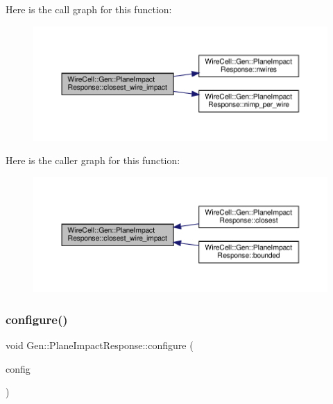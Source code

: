 Here is the call graph for this function\+:
\nopagebreak
\begin{figure}[H]
\begin{center}
\leavevmode
\includegraphics[width=350pt]{class_wire_cell_1_1_gen_1_1_plane_impact_response_a205df947b332100ddf1179b58b46f47e_cgraph}
\end{center}
\end{figure}
Here is the caller graph for this function\+:
\nopagebreak
\begin{figure}[H]
\begin{center}
\leavevmode
\includegraphics[width=350pt]{class_wire_cell_1_1_gen_1_1_plane_impact_response_a205df947b332100ddf1179b58b46f47e_icgraph}
\end{center}
\end{figure}
\mbox{\label{class_wire_cell_1_1_gen_1_1_plane_impact_response_a5ab969666fea20210311a3751db47db0}} 
\subsubsection{\texorpdfstring{configure()}{configure()}}
{\footnotesize\ttfamily void Gen\+::\+Plane\+Impact\+Response\+::configure (\begin{DoxyParamCaption}\item[{const \hyperlink{namespace_wire_cell_a9f705541fc1d46c608b3d32c182333ee}{Wire\+Cell\+::\+Configuration} \&}]{config }\end{DoxyParamCaption})\hspace{0.3cm}{\ttfamily [virtual]}}



